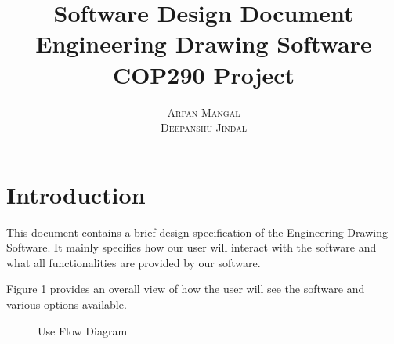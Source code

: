 \documentclass[a4paper,12pt,openany]{report}
\title{\Huge \textbf{Software Design Document}
 \\
 \Huge \textbf{ Engineering Drawing Software} \vspace{10pt}\\\huge{COP290 Project }}
\author{\textsc{Arpan Mangal}
 \\
 \textsc{Deepanshu Jindal}}
\begin{document}
\maketitle



\chapter*{Introduction}
This document contains a brief design specification of the Engineering Drawing Software. It mainly specifies how our user will interact with the software and what all functionalities are provided by our software.

Figure 1 provides an overall view of how the user will see the software and various options available.
\begin{figure}[h]
	\centering
	\caption{Use Flow Diagram}
\end{figure}

\end{document}
